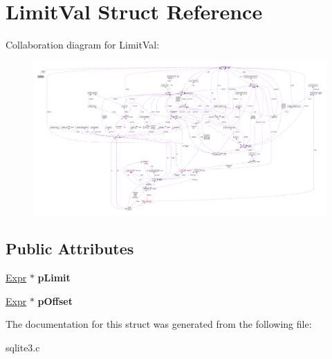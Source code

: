 \hypertarget{structLimitVal}{}\section{Limit\+Val Struct Reference}
\label{structLimitVal}


Collaboration diagram for Limit\+Val\+:\nopagebreak
\begin{figure}[H]
\begin{center}
\leavevmode
\includegraphics[width=350pt]{structLimitVal__coll__graph}
\end{center}
\end{figure}
\subsection*{Public Attributes}
\begin{DoxyCompactItemize}
\item 
\hyperlink{structExpr}{Expr} $\ast$ {\bfseries p\+Limit}\hypertarget{structLimitVal_a96094d1b395a3f455263ff5907d72ed6}{}\label{structLimitVal_a96094d1b395a3f455263ff5907d72ed6}

\item 
\hyperlink{structExpr}{Expr} $\ast$ {\bfseries p\+Offset}\hypertarget{structLimitVal_a43dedf453a8e5cb8091fcde524a7c736}{}\label{structLimitVal_a43dedf453a8e5cb8091fcde524a7c736}

\end{DoxyCompactItemize}


The documentation for this struct was generated from the following file\+:\begin{DoxyCompactItemize}
\item 
sqlite3.\+c\end{DoxyCompactItemize}
